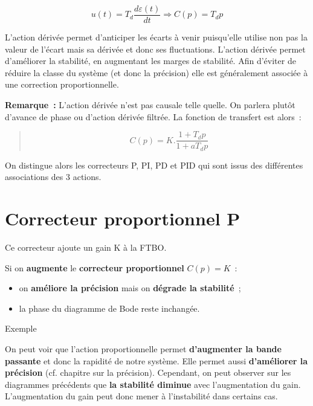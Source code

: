 \[u(t) = T_{d}\frac{d\varepsilon(t)}{dt} \Rightarrow \boxed{C(p) = T_{d}p}\]

L'action dérivée permet d'anticiper les écarts à venir puisqu'elle utilise non pas la valeur de l'écart mais sa dérivée et donc ses fluctuations. L'action dérivée permet d'améliorer la stabilité, en augmentant les marges de stabilité. Afin d'éviter de réduire la classe du système (et donc la précision) elle est généralement associée à une correction proportionnelle.

\textbf{Remarque~:} L'action dérivée n'est pas causale telle quelle. On parlera plutôt d'avance de phase ou d'action dérivée filtrée. La fonction de transfert est alors~:

\begin{quote}
\[\boxed{C(p) = K.\frac{1 + T_{d}p}{1 + aT_{d}p}}\]
\end{quote}

On distingue alors les correcteurs P, PI, PD et PID qui sont issus des différentes associations des 3 actions.

\hypertarget{correcteur-proportionnel-p}{%
\section{Correcteur proportionnel P}\label{correcteur-proportionnel-p}}

\TLBodeCorrecteurP[10]


Ce correcteur ajoute un gain K à la FTBO.

Si on \textbf{augmente} le \textbf{correcteur proportionnel} \(C(p) = K\)~:

\begin{itemize}
\item
  on \textbf{améliore la précision} mais on \textbf{dégrade la stabilité}~;
\item
  la phase du diagramme de Bode reste inchangée.
\end{itemize}

Exemple

\begin{quote}

\end{quote}

On peut voir que l'action proportionnelle permet \textbf{d'augmenter la bande passante} et donc la rapidité de notre système. Elle permet aussi \textbf{d'améliorer la précision} (cf. chapitre sur la précision). Cependant, on peut observer sur les diagrammes précédents que \textbf{la stabilité diminue} avec l'augmentation du gain. L'augmentation du gain peut donc mener à l'instabilité dans certains cas.

